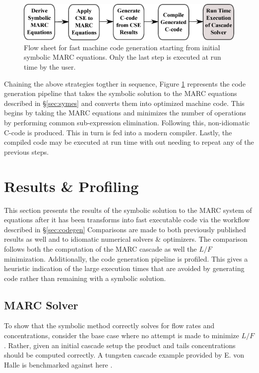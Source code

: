 \documentclass[preprint,12pt]{elsarticle}
\begin{document}
\begin{figure}
\begin{center}
\includegraphics[scale=0.45]{codegen_pipeline.eps}
\caption{Flow sheet for fast machine code generation starting from initial symbolic MARC
equations.  Only the last step is executed at run time by the user.}
\end{center}
\label{codegen_pipeline}
\end{figure}

Chaining the above strategies togther in sequence, Figure \ref{codegen_pipeline} 
represents the 
code generation pipeline that takes the symbolic solution to the MARC equations
described in \S\ref{sec:symes} and converts them into optimized machine code.
This begins by taking the MARC equations and minimizes the number of operations
by performing common sub-expression elimination.  Following this, non-idiomatic
C-code is produced.  This in turn is fed into a modern compiler.  Lastly, the compiled
code may be executed at run time with out needing to repeat any of the previous steps.

\section{Results \& Profiling}
\label{sec:res}
This section presents the results of the symbolic solution to the MARC system 
of equations after it has been transforms into fast executable code via the 
workflow described in \S\ref{sec:codegen}  Comparisons are made to both previously
published results as well and to idiomatic numerical solvers \& optimizers.  The 
comparison follows both the computation of the MARC cascade as well the $L/F$ 
minimization. Additionally, the code generation pipeline is profiled.  This gives a
heuristic indication of the large execution times that are avoided by generating 
code rather than remaining with a symbolic solution.

\subsection{MARC Solver}
\label{sec:l-solver}

To show that the symbolic method correctly solves for flow rates and concentrations,
consider the base case where no attempt is made to minimize $L/F$.  Rather, given 
an initial cascade setup the product and tails concentrations should be computed 
correctly.  A tungsten cascade example provided by E. von Halle is benchmarked against
here \cite{VonHalle1987}.
\end{document}
